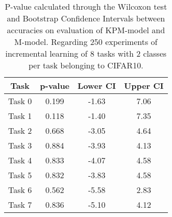 \begin{table}[H]
\centering
\begin{tabular}{cccc}
\toprule
Task & p-value & Lower CI & Upper CI \\
\midrule
Task 0 & 0.199 &-1.63 & 7.06 \\
Task 1 & 0.118 &-1.40 & 7.35 \\
Task 2 & 0.668 &-3.05 & 4.64 \\
Task 3 & 0.884 &-3.93 & 4.13 \\
Task 4 & 0.833 &-4.07 & 4.58 \\
Task 5 & 0.832 &-3.83 & 4.58 \\
Task 6 & 0.562 &-5.58 & 2.83 \\
Task 7 & 0.836 &-5.10 & 4.12 \\
\bottomrule
\end{tabular}
\caption{P-value calculated through the Wilcoxon test and Bootstrap Confidence Intervals between accuracies on evaluation of KPM-model and M-model. Regarding 250 experiments of incremental learning of 8 tasks with 2 classes per task belonging to CIFAR10.}
\end{table}

